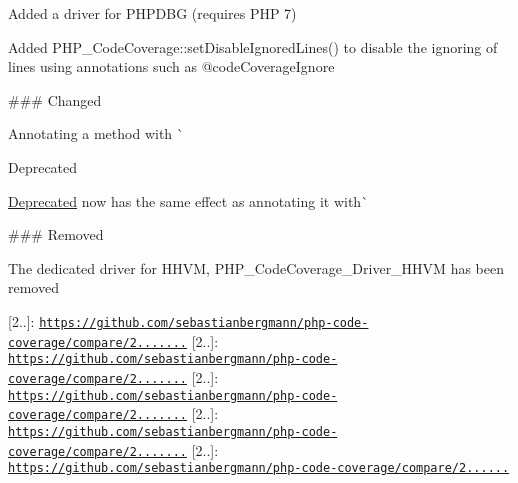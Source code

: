 \begin{DoxyItemize}
\item Added a driver for P\+H\+P\+D\+BG (requires P\+HP 7)
\item Added {\ttfamily P\+H\+P\+\_\+\+Code\+Coverage\+::set\+Disable\+Ignored\+Lines()} to disable the ignoring of lines using annotations such as {\ttfamily @code\+Coverage\+Ignore}
\end{DoxyItemize}

\#\#\# Changed


\begin{DoxyItemize}
\item Annotating a method with \`{}\begin{DoxyRefDesc}{Deprecated}
\item[\mbox{\hyperlink{deprecated__deprecated000024}{Deprecated}}]{\ttfamily now has the same effect as annotating it with}\`{}\end{DoxyRefDesc}

\end{DoxyItemize}

\#\#\# Removed


\begin{DoxyItemize}
\item The dedicated driver for H\+H\+VM, {\ttfamily P\+H\+P\+\_\+\+Code\+Coverage\+\_\+\+Driver\+\_\+\+H\+H\+VM} has been removed
\end{DoxyItemize}

\mbox{[}2..\mbox{]}\+: \href{https://github.com/sebastianbergmann/php-code-coverage/compare/2.2.3...2.2.4}{\tt https\+://github.\+com/sebastianbergmann/php-\/code-\/coverage/compare/2.......} \mbox{[}2..\mbox{]}\+: \href{https://github.com/sebastianbergmann/php-code-coverage/compare/2.2.2...2.2.3}{\tt https\+://github.\+com/sebastianbergmann/php-\/code-\/coverage/compare/2.......} \mbox{[}2..\mbox{]}\+: \href{https://github.com/sebastianbergmann/php-code-coverage/compare/2.2.1...2.2.2}{\tt https\+://github.\+com/sebastianbergmann/php-\/code-\/coverage/compare/2.......} \mbox{[}2..\mbox{]}\+: \href{https://github.com/sebastianbergmann/php-code-coverage/compare/2.2.0...2.2.1}{\tt https\+://github.\+com/sebastianbergmann/php-\/code-\/coverage/compare/2.......} \mbox{[}2..\mbox{]}\+: \href{https://github.com/sebastianbergmann/php-code-coverage/compare/2.1...2.2.0}{\tt https\+://github.\+com/sebastianbergmann/php-\/code-\/coverage/compare/2......} 